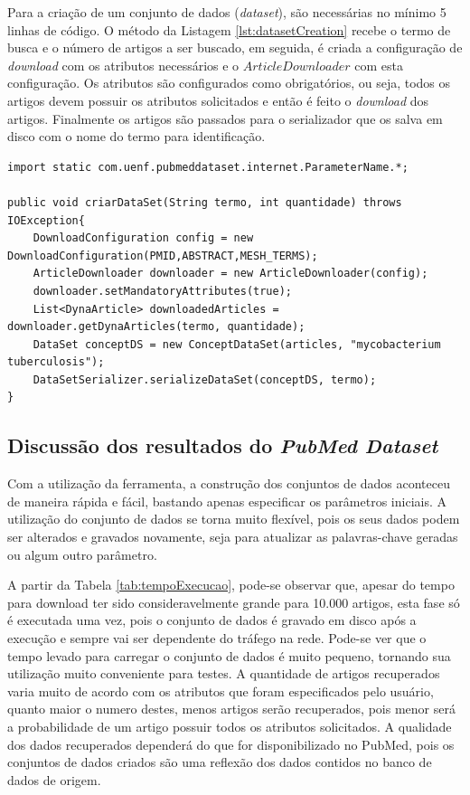 Para a criação de um conjunto de dados (\emph{dataset}), são necessárias no mínimo 5 linhas de código. O método da Listagem \ref{lst:datasetCreation} recebe o termo de busca e o número de artigos a ser buscado, em seguida, é criada a configuração de \emph{download} com os atributos necessários e o $ArticleDownloader$ com esta configuração. Os atributos são configurados como obrigatórios, ou seja, todos os artigos devem possuir os atributos solicitados e então é feito o \emph{download} dos artigos. Finalmente os artigos são passados para o serializador que os salva em disco com o nome do termo para identificação.

\begin{lstlisting}
import static com.uenf.pubmeddataset.internet.ParameterName.*;

public void criarDataSet(String termo, int quantidade) throws IOException{
    DownloadConfiguration config = new DownloadConfiguration(PMID,ABSTRACT,MESH_TERMS);
    ArticleDownloader downloader = new ArticleDownloader(config);
    downloader.setMandatoryAttributes(true);
    List<DynaArticle> downloadedArticles = downloader.getDynaArticles(termo, quantidade);
    DataSet conceptDS = new ConceptDataSet(articles, "mycobacterium tuberculosis");
    DataSetSerializer.serializeDataSet(conceptDS, termo);
}
\end{lstlisting}

\subsection{Discussão dos resultados do \emph{PubMed Dataset}}

Com a utilização da ferramenta, a construção dos conjuntos de dados aconteceu de maneira
rápida e fácil, bastando apenas especificar os parâmetros iniciais. A utilização do conjunto de
dados se torna muito flexível, pois os seus dados podem ser alterados e gravados novamente,
seja para atualizar as palavras-chave geradas ou algum outro parâmetro.

A partir da Tabela \ref{tab:tempoExecucao}, pode-se observar que, apesar do tempo para download ter sido
consideravelmente grande para 10.000 artigos, esta fase só é executada uma vez, pois o
conjunto de dados é gravado em disco após a execução e sempre vai ser dependente do tráfego
na rede. Pode-se ver que o tempo levado para carregar o conjunto de dados é muito pequeno,
tornando sua utilização muito conveniente para testes. A quantidade de artigos recuperados
varia muito de acordo com os atributos que foram especificados pelo usuário, quanto maior o
numero destes, menos artigos serão recuperados, pois menor será a probabilidade de um artigo
possuir todos os atributos solicitados. A qualidade dos dados recuperados dependerá do que for
disponibilizado no PubMed, pois os conjuntos de dados criados são uma reflexão dos dados
contidos no banco de dados de origem.

